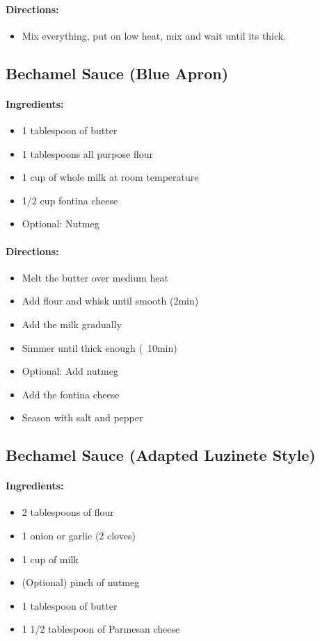 \documentclass{article}
\begin{document}
\paragraph{Directions:}
\begin{itemize}
    \item Mix everything, put on low heat, mix and wait until its thick.
\end{itemize}

\subsection{Bechamel Sauce (Blue Apron)}

\paragraph{Ingredients:}
\begin{itemize}
    \item 1 tablespoon of butter
    \item 1 tablespoons all purpose flour
    \item 1 cup of whole milk at room temperature
    \item 1/2 cup fontina cheese
    \item Optional: Nutmeg
\end{itemize}

\paragraph{Directions:}
\begin{itemize}
    \item Melt the butter over medium heat
    \item Add flour and whisk until smooth (2min)
    \item Add the milk gradually
    \item Simmer until thick enough (~10min)
    \item Optional: Add nutmeg
    \item Add the fontina cheese
    \item Season with salt and pepper
\end{itemize}

\subsection{Bechamel Sauce (Adapted Luzinete Style)}

\paragraph{Ingredients:}
\begin{itemize}
    \item 2 tablespoons of flour
    \item 1 onion or garlic (2 cloves)
    \item 1 cup of milk
    \item (Optional) pinch of nutmeg
    \item 1 tablespoon of butter
    \item 1 1/2 tablespoon of Parmesan cheese
\end{itemize}
\end{document}
